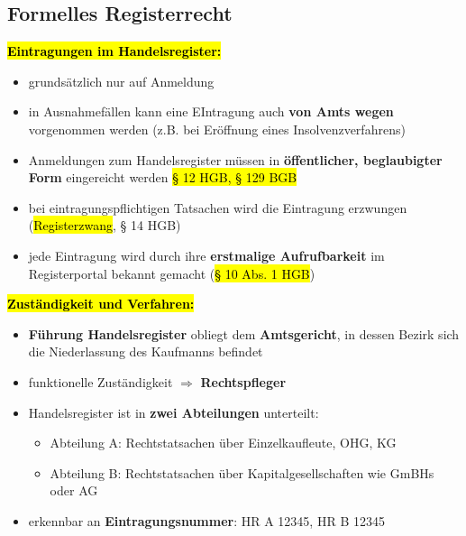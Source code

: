 \documentclass[a4paper, 10pt]{article}
\begin{document}
\subsection{Formelles Registerrecht}
\textbf{\hl{Eintragungen im Handelsregister:}}
\begin{itemize}
    \item grundsätzlich nur auf Anmeldung
    \item in Ausnahmefällen kann eine EIntragung auch \textbf{von Amts wegen} vorgenommen werden (z.B. bei Eröffnung eines Insolvenzverfahrens)
    \item Anmeldungen zum Handelsregister müssen in \textbf{öffentlicher, beglaubigter Form} eingereicht werden \hl{§ 12 HGB, § 129 BGB}
    \item bei eintragungspflichtigen Tatsachen wird die Eintragung erzwungen (\hl{Registerzwang}, § 14 HGB)
    \item jede Eintragung wird durch ihre \textbf{erstmalige Aufrufbarkeit} im Registerportal bekannt gemacht (\hl{§ 10 Abs. 1 HGB})
\end{itemize}
\newpage
\noindent\textbf{\hl{Zuständigkeit und Verfahren:}}
\begin{itemize}
    \item \textbf{Führung Handelsregister} obliegt dem \textbf{Amtsgericht}, in dessen Bezirk sich die Niederlassung des Kaufmanns befindet
    \item funktionelle Zuständigkeit $\Longrightarrow$ \textbf{Rechtspfleger}
    \item Handelsregister ist in \textbf{zwei Abteilungen} unterteilt:
    \begin{itemize}
        \item Abteilung A: Rechtstatsachen über Einzelkaufleute, OHG, KG
        \item Abteilung B: Rechtstatsachen über Kapitalgesellschaften wie GmBHs oder AG
    \end{itemize}

    \item erkennbar an \textbf{Eintragungsnummer}: HR A 12345, HR B 12345
\end{itemize}
\end{document}
